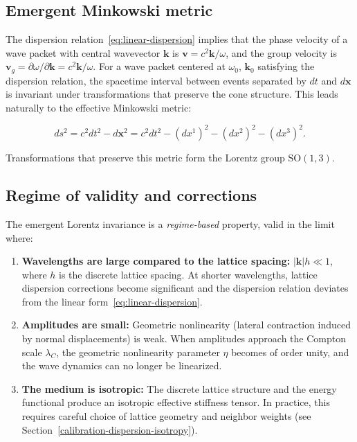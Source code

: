 \subsection{Emergent Minkowski metric}

The dispersion relation~\eqref{eq:linear-dispersion} implies that the phase
velocity of a wave packet with central wavevector $\mathbf{k}$ is $\mathbf{v}
= c^2 \mathbf{k} / \omega$, and the group velocity is $\mathbf{v}_g = \partial
\omega / \partial \mathbf{k} = c^2 \mathbf{k} / \omega$. For a wave packet
centered at $\omega_0$, $\mathbf{k}_0$ satisfying the dispersion relation, the
spacetime interval between events separated by $dt$ and $d\mathbf{x}$ is
invariant under transformations that preserve the cone structure. This leads
naturally to the effective Minkowski metric:

\begin{equation}
ds^2 = c^2 dt^2 - d\mathbf{x}^2 = c^2 dt^2 - (dx^1)^2 - (dx^2)^2 - (dx^3)^2.
\label{eq:minkowski-metric}
\end{equation}

Transformations that preserve this metric form the Lorentz group $\mathrm{SO}(1,3)$.

\subsection{Regime of validity and corrections}

The emergent Lorentz invariance is a \emph{regime-based} property, valid in the
limit where:

\begin{enumerate}
\item \textbf{Wavelengths are large compared to the lattice spacing:}
  $|\mathbf{k}| h \ll 1$, where $h$ is the discrete lattice spacing. At shorter
  wavelengths, lattice dispersion corrections become significant and the
  dispersion relation deviates from the linear form~\eqref{eq:linear-dispersion}.

\item \textbf{Amplitudes are small:} Geometric nonlinearity (lateral contraction
  induced by normal displacements) is weak. When amplitudes approach the
  Compton scale $\lambda_C$, the geometric nonlinearity parameter $\eta$
  becomes of order unity, and the wave
  dynamics can no longer be linearized.

\item \textbf{The medium is isotropic:} The discrete lattice structure and the
  energy functional produce an isotropic effective stiffness tensor. In
  practice, this requires careful choice of lattice geometry and neighbor
  weights (see Section~\ref{calibration-dispersion-isotropy}).
\end{enumerate}

